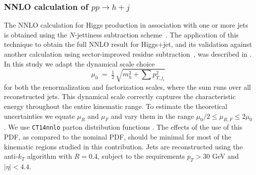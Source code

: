 \subsubsection{NNLO calculation of $pp\to h+j$}
\label{sec:hjetscomp:tools:fo:BFGLP}

The NNLO calculation for Higgs production in association with one or 
more jets is obtained using the $N$-jettiness subtraction 
scheme~\cite{Boughezal:2015dva,Gaunt:2015pea}.  The application of 
this technique to obtain the full NNLO result for Higgs+jet, and its 
validation against another calculation using sector-improved residue 
subtraction~\cite{Boughezal:2015dra}, was described in 
\cite{Boughezal:2015aha}.  In this study we adapt the dynamical scale choice
%
\begin{equation}\label{eq:bfglpScale}
  \mu_0\;=\;\tfrac{1}{2}\,\sqrt{m_{h}^2+\sum p_{T,j_i}^2}
\end{equation}
%
for both the renormalization and factorization scales, where the sum 
runs over all reconstructed jets.  This dynamical scale correctly 
captures the characteristic energy throughout the entire kinematic 
range.  To estimate the theoretical uncertainties we equate $\mu_R$ 
and $\mu_F$ and vary them in the range $\mu_0/2 \leq \mu_{R,F} \leq 2 \mu_0$.  
We use \texttt{CT14nnlo} parton distribution functions 
\cite{Dulat:2015mca}. The effects of the use of this PDF, as compared to the nominal PDF, should be 
minimal for most of the kinematic regions studied in this contribution. Jets are reconstructed using the anti-$k_T$ algorithm 
with $R=0.4$, subject to the requirements $p_T>30$ GeV and $|\eta|<4.4$.
